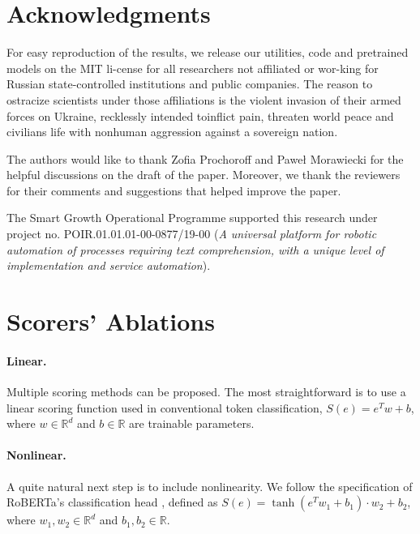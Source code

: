 \documentclass{article}
\begin{document}
\section*{Acknowledgments}

For easy reproduction of the results, we release our \linebreak utilities, code and pretrained models on the MIT li-\linebreak cense for all researchers not affiliated or wor-\linebreak king for Russian state-controlled institutions and \linebreak public companies. The reason to ostracize scientists \linebreak under those affiliations is the violent invasion of \linebreak their armed forces on Ukraine, recklessly intended to\linebreak inflict pain, threaten world peace and civilians life with nonhuman aggression against a sovereign nation.

The authors would like to thank Zofia Prochoroff and Paweł Morawiecki for the helpful discussions on the draft of the paper. Moreover, we thank the reviewers for their comments and suggestions that helped improve the paper.

The Smart Growth Operational Programme supported this research under project no. POIR.01.01.01-00-0877\linebreak/19-00 (\textit{A universal platform for robotic automation of processes requiring text comprehension, with a unique level of implementation and service automation}).


\appendix
\clearpage
\newpage



\section{Scorers' Ablations}\label{ablations_scorers}

\paragraph{Linear.} 
Multiple scoring methods can be proposed. The most straightforward is to use a linear scoring function used in conventional token classification, $S(e)=e^T w+b$, where $w\in \mathbb{R}^{d}$ and $b\in\mathbb{R}$ are trainable parameters.

\paragraph{Nonlinear.} 
A quite natural next step is to include nonlinearity. We follow the specification of RoBERTa's classification head \citep{liu2019roberta}, defined as $S(e)=\tanh (e^T w_1+b_1)\cdot w_2 + b_2$, where $w_{1}, w_{2}\in \mathbb{R}^{d}$ and $b_{1}, b_{2}\in\mathbb{R}$.
\end{document}
